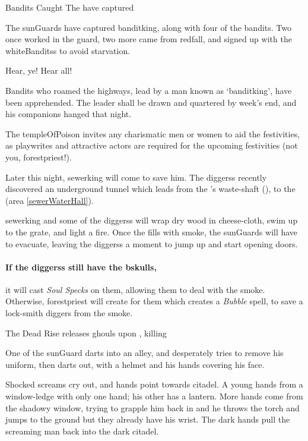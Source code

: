 {Bandits Caught}%
{The  have captured }%
\label{banditsCaught}

The \glspl{sunGuard} have captured \gls{banditking}, along with four of the bandits.
Two once worked in the \gls{guard}, two more came from \gls{redfall}, and signed up with the \glspl{whiteBandits} to avoid starvation.

\begin{speechtext}
  Hear, ye!  Hear all!

  Bandits who roamed the highways, lead by a man known as `\gls{banditking}', have been apprehended.
  The leader shall be drawn and quartered by week's end, and his companions hanged that night.

  The \gls{templeOfPoison} invites any charismatic men or women to aid the festivities, as playwrites and attractive actors are required for the upcoming festivities (not you, \gls{forestpriest}!).
\end{speechtext}

Later this night, \gls{sewerking} will come to save him.
The \glspl{diggers} recently discovered an underground tunnel which leads from the 's waste-shaft (), to the  (area \vref{sewerWaterHall}).

\Gls{sewerking} and some of the \glspl{diggers} will wrap dry wood in cheese-cloth, swim up to the grate, and light a fire.
Once the  fills with smoke, the \glspl{sunGuard} will have to evacuate, leaving the \glspl{diggers} a moment to jump up and start opening doors.

\paragraph{If the \glspl{diggers} still have the \gls{bskulls},}
it will cast \textit{Soul Specks} on them, allowing them to deal with the smoke.
Otherwise, \gls{forestpriest} will create  for them which creates a \textit{Bubble} spell, to save a lock-smith \gls{diggers} from the smoke.

{The Dead Rise}%
{ releases \glspl{ghoul} upon , killing }%
\label{deadRise}

\begin{boxtext}
  One of the \gls{sunGuard} darts into an alley, and desperately tries to remove his uniform, then darts out, with a helmet and his hands covering his face.

  Shocked screams cry out, and hands point towards \gls{citadel}.
  A young hands from a window-ledge with only one hand; his other has a lantern.
  More hands come from the shadowy window, trying to grapple him back in and he throws the \gls{torch} and jumps to the ground but they already have his wrist.
  The dark hands pull the screaming man back into the dark citadel.
\end{boxtext}

